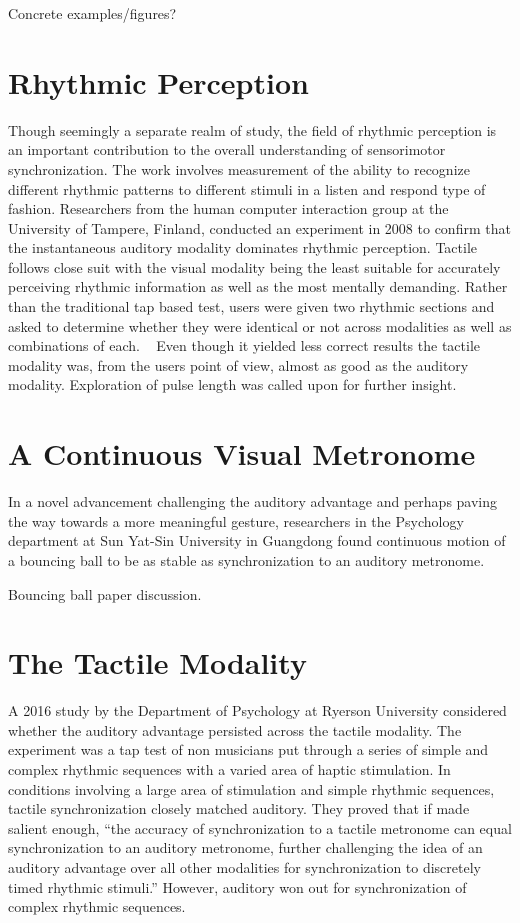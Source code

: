 Concrete examples/figures?

\section{Rhythmic Perception}
Though seemingly a separate realm of study, the field of rhythmic perception is an important contribution to the overall understanding of sensorimotor synchronization. The work involves measurement of the ability to recognize different rhythmic patterns to different stimuli in a listen and respond type of fashion. Researchers from the human computer interaction group at the University of Tampere, Finland, conducted an experiment in 2008 to confirm that the instantaneous auditory modality dominates rhythmic perception. Tactile follows close suit with the visual modality being the least suitable for accurately perceiving rhythmic information as well as the most mentally demanding. Rather than the traditional tap based test, users were given two rhythmic sections and asked to determine whether they were identical or not across modalities as well as combinations of each. ~\cite{jokiniemi2008crossmodal} Even though it yielded less correct results the tactile modality was, from the users point of view, almost as good as the auditory modality. Exploration of pulse length was called upon for further insight.

\section{A Continuous Visual Metronome}
In a novel advancement challenging the auditory advantage and perhaps paving the way towards a more meaningful gesture, researchers in the Psychology department at Sun Yat-Sin University in Guangdong found continuous motion of a bouncing ball to be as stable as synchronization to an auditory metronome.
~\cite{gan2015synchronization}


Bouncing ball paper discussion.

\section{The Tactile Modality}
A 2016 study by the Department of Psychology at Ryerson University considered whether the auditory advantage persisted across the tactile modality. The experiment was a tap test of non musicians put through a series of simple and complex rhythmic sequences with a varied area of haptic stimulation. In conditions involving a large area of stimulation and simple rhythmic sequences, tactile synchronization closely matched auditory. They proved that if made salient enough, “the accuracy of synchronization to a tactile metronome can equal synchronization to an auditory metronome, further challenging the idea of an auditory advantage over all other modalities for synchronization to discretely timed rhythmic stimuli.” However, auditory won out for synchronization of complex rhythmic sequences. ~\cite{ammirante2016synchronizing}

